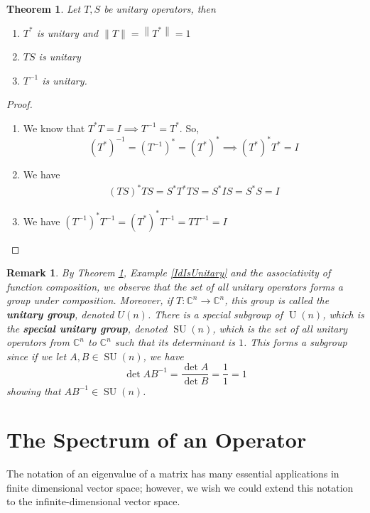 \documentclass{report}
\newtheorem{thm}{Theorem}
\newtheorem{rem}{Remark}
\begin{document}
\begin{thm} \label{UnitaryProp}
Let $T, S$ be unitary operators, then
\begin{enumerate}
  \item $T^{*}$ is unitary and $\|T\|=\left\|T^{*}\right\|=1$
  \item $T S$ is unitary
  \item $T^{-1}$ is unitary.
\end{enumerate}
\end{thm}
\begin{proof}
  \begin{enumerate}
    \item We know that $T^{*}T = I\implies T^{-1}=T^{*}$. So,
      $$
      (T^{*})^{-1}=(T^{-1})^{*}=(T^{*})^{*}\implies (T^{*})^{*}T^{*}=I
      $$
    \item We have
      $$
      \begin{aligned}
        (TS)^{*}TS = S^{*}T^{*}TS = S^{*}IS = S^{*}S = I
      \end{aligned}
      $$
    \item We have $(T^{-1})^{*}T^{-1} = (T^{*})^{*}T^{-1} = TT^{-1} = I$
  \end{enumerate}
\end{proof}

\begin{rem}
  By Theorem \ref{UnitaryProp}, Example \ref{IdIsUnitary} and the associativity of function composition, we observe that the set of all unitary operators forms a group under composition. Moreover, if $T:\mathbb{C}^{n}\to\mathbb{C}^{n}$, this group is called the \textbf{unitary group}, denoted $U(n)$. There is a special subgroup of $\operatorname{U}(n)$, which is the \textbf{special unitary group}, denoted $\operatorname{SU}(n)$, which is the set of all unitary operators from $\mathbb{C}^{n}$ to $\mathbb{C}^{n}$ such that its determinant is $1$. This forms a subgroup since if we let $A,B\in\operatorname{SU}(n)$, we have
  $$
  \operatorname{det}AB^{-1} = \frac{\operatorname{det}A}{\operatorname{det}B} = \frac{1}{1} = 1
  $$
  showing that $AB^{-1}\in\operatorname{SU}(n)$.
\end{rem}

\section{The Spectrum of an Operator}
The notation of an eigenvalue of a matrix has many essential applications in finite dimensional vector space; however, we wish we could extend this notation to the infinite-dimensional vector space.
\end{document}
